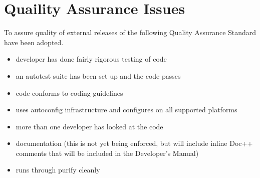 \chapter{Quaility Assurance Issues}
\label{Quaility Assurance Issues}

To assure quality of external releases of \hypre{} the following Quality
Assurance Standard have been adopted.  
\begin{itemize}

\item developer has done fairly rigorous testing of code

\item an autotest suite has been set up and the code passes

\item code conforms to coding guidelines

\item uses autoconfig infrastructure and configures on all supported
platforms

\item more than one developer has looked at the code

\item documentation (this is not yet being enforced, but will include
inline Doc++ comments that will be included in the Developer's Manual)

\item runs through purify cleanly

\end{itemize}

